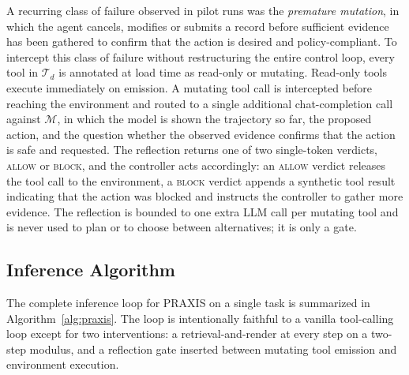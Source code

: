 \documentclass[conference]{IEEEtran}
\begin{document}
A recurring class of failure observed in pilot runs was the
\emph{premature mutation}, in which the agent cancels, modifies or
submits a record before sufficient evidence has been gathered to
confirm that the action is desired and policy-compliant. To
intercept this class of failure without restructuring the entire
control loop, every tool in $\mathcal{T}_d$ is annotated at load
time as read-only or mutating. Read-only tools execute immediately
on emission. A mutating tool call is intercepted before reaching
the environment and routed to a single additional chat-completion
call against $\mathcal{M}$, in which the model is shown the
trajectory so far, the proposed action, and the question whether
the observed evidence confirms that the action is safe and
requested. The reflection returns one of two single-token
verdicts, \textsc{allow} or \textsc{block}, and the controller
acts accordingly: an \textsc{allow} verdict releases the tool call
to the environment, a \textsc{block} verdict appends a synthetic
tool result indicating that the action was blocked and instructs
the controller to gather more evidence. The reflection is bounded
to one extra LLM call per mutating tool and is never used to plan
or to choose between alternatives; it is only a gate.

\subsection{Inference Algorithm}

The complete inference loop for PRAXIS on a single task is
summarized in Algorithm~\ref{alg:praxis}. The loop is intentionally
faithful to a vanilla tool-calling loop except for two
interventions: a retrieval-and-render at every step on a two-step
modulus, and a reflection gate inserted between mutating tool
emission and environment execution.
\end{document}
